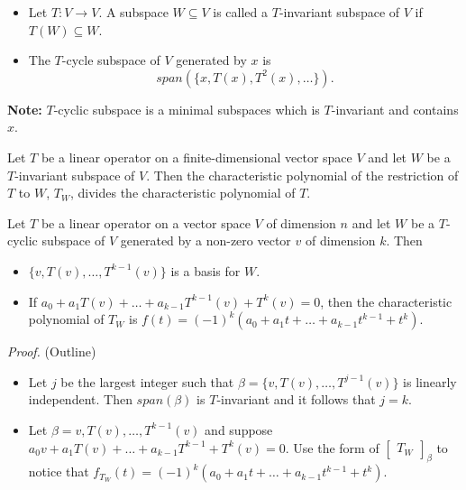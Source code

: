 \documentclass[12pt]{article}
\newenvironment{theorem}[2][Theorem]{\begin{trivlist}
\item[\hskip \labelsep {\bfseries #1}\hskip \labelsep {\bfseries #2.}]}{\end{trivlist}}
\newenvironment{definition}[2][Definition]{\begin{trivlist}
\item[\hskip \labelsep {\bfseries #1}\hskip \labelsep {\bfseries #2}]}{\end{trivlist}}
\begin{document}
\begin{definition}{6} \text{ }
\begin{itemize}
    \item Let $T : V \to V$. A subspace $W \subseteq V$ is called a $T$-invariant subspace of $V$ if $T(W) \subseteq W$.
    
    \item The $T$-cycle subspace of $V$ generated by $x$ is $$span(\{x, T(x), T^2(x), \dots\}).$$
\end{itemize}
\end{definition}

\textbf{Note:} $T$-cyclic subspace is a minimal subspaces which is $T$-invariant and contains $x$.

\begin{theorem}{5.21}
Let $T$ be a linear operator on a finite-dimensional vector space $V$ and let $W$ be a $T$-invariant subspace of $V$. Then the characteristic polynomial of the restriction of $T$ to $W$, $T_W$, divides the characteristic polynomial of $T$. 
\end{theorem}

\begin{theorem}{5.22}
Let $T$ be a linear operator on a vector space $V$ of dimension $n$ and let $W$ be a $T$-cyclic subspace of $V$ generated by a non-zero vector $v$ of dimension $k$. Then

\begin{itemize}
    \item[(a)] $\{v, T(v), \dots, T^{k - 1}(v)\}$ is a basis for $W$. 
    
    \item[(b)] If $a_0 + a_1T(v) + \dots + a_{k-1}T^{k-1}(v) + T^k(v) = 0$, then the characteristic polynomial of $T_W$ is $f(t) = (-1)^k(a_0 + a_1t + \dots + a_{k-1}t^{k-1} + t^k)$.
\end{itemize}
\end{theorem}

\textit{Proof.} (Outline)
\begin{itemize}
    \item[(a)] Let $j$ be the largest integer such that $\beta = \{v, T(v), \dots, T^{j - 1}(v)\}$ is linearly independent. Then $span(\beta)$ is $T$-invariant and it follows that $j = k$.
    
    \item[(b)] Let $\beta = v, T(v), \dots, T^{k - 1}(v)$ and suppose $a_0v + a_1T(v) + \dots + a_{k - 1}T^{k-1} + T^k(v) = 0$. Use the form of $\begin{bmatrix}
    T_W
    \end{bmatrix}_\beta$ to notice that $f_{T_W}(t) = (-1)^k(a_0 + a_1t + \dots + a_{k-1}t^{k-1} + t^k)$.
\end{itemize}
\end{document}
